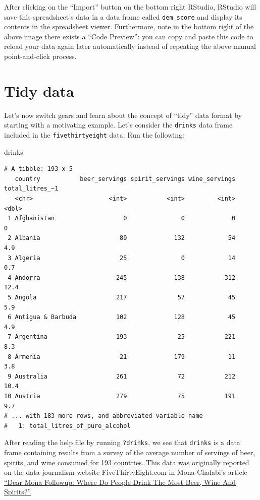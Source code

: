 \documentclass[
  letterpaper,
  DIV=11,
  numbers=noendperiod]{scrreprt}
\newenvironment{Shaded}{\begin{snugshade}}{\end{snugshade}}
\newcommand{\NormalTok}[1]{\textcolor[rgb]{0.00,0.23,0.31}{#1}}
\theoremstyle{definition}
\theoremstyle{remark}
\begin{document}
After clicking on the ``Import'' button on the bottom right RStudio,
RStudio will save this spreadsheet's data in a data frame called
\texttt{dem\_score} and display its contents in the spreadsheet viewer.
Furthermore, note in the bottom right of the above image there exists a
``Code Preview'': you can copy and paste this code to reload your data
again later automatically instead of repeating the above manual
point-and-click process.

\hypertarget{sec-tidy-data-ex}{%
\section{Tidy data}\label{sec-tidy-data-ex}}

Let's now switch gears and learn about the concept of ``tidy'' data
format by starting with a motivating example. Let's consider the
\texttt{drinks} data frame included in the \texttt{fivethirtyeight}
data. Run the following:

\begin{Shaded}
\begin{Highlighting}[]
\NormalTok{drinks}
\end{Highlighting}
\end{Shaded}

\begin{verbatim}
# A tibble: 193 x 5
   country           beer_servings spirit_servings wine_servings total_litres_~1
   <chr>                     <int>           <int>         <int>           <dbl>
 1 Afghanistan                   0               0             0             0  
 2 Albania                      89             132            54             4.9
 3 Algeria                      25               0            14             0.7
 4 Andorra                     245             138           312            12.4
 5 Angola                      217              57            45             5.9
 6 Antigua & Barbuda           102             128            45             4.9
 7 Argentina                   193              25           221             8.3
 8 Armenia                      21             179            11             3.8
 9 Australia                   261              72           212            10.4
10 Austria                     279              75           191             9.7
# ... with 183 more rows, and abbreviated variable name
#   1: total_litres_of_pure_alcohol
\end{verbatim}

After reading the help file by running \texttt{?drinks}, we see that
\texttt{drinks} is a data frame containing results from a survey of the
average number of servings of beer, spirits, and wine consumed for 193
countries. This data was originally reported on the data journalism
website FiveThirtyEight.com in Mona Chalabi's article
\href{https://fivethirtyeight.com/features/dear-mona-followup-where-do-people-drink-the-most-beer-wine-and-spirits/}{``Dear
Mona Followup: Where Do People Drink The Most Beer, Wine And Spirits?''}
\end{document}
